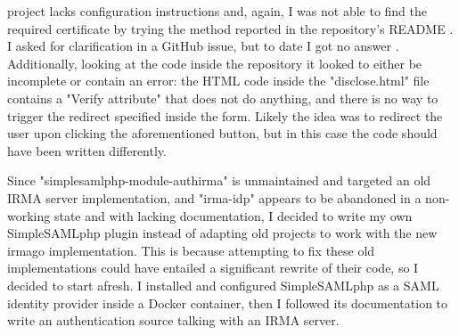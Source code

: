 \documentclass{report}
\begin{document}
project lacks configuration instructions and, again, I was not able to find the required certificate by trying the method reported in the repository's README \cite{irma-idp}. I asked for 
clarification in a GitHub issue, but to date I got no answer \cite{irma-idp-issue}. Additionally, looking at the code inside the repository it looked to either be incomplete or
contain an error: the HTML code inside the "disclose.html" file contains a "Verify attribute" that does not do anything, and there is no way to trigger the redirect specified
inside the form. Likely the idea was to redirect the user upon clicking the aforementioned button, but in this case the code should have been written differently. \par
Since "simplesamlphp-module-authirma" is unmaintained and targeted an old IRMA server implementation, and "irma-idp" appears to be abandoned in a non-working state and with lacking
documentation, I decided to write my own SimpleSAMLphp plugin instead of adapting old projects to work with the new irmago implementation. This is because attempting to fix these
old implementations could have entailed a significant rewrite of their code, so I decided to start afresh. I installed and configured SimpleSAMLphp \cite{simplesamlphp-docs} as a SAML identity
provider \cite{sstc-saml-core-errata-2.0-wd-07} inside a Docker container, then I followed its documentation to write an authentication source talking with an IRMA server. 


\iffalse
\end{document}
